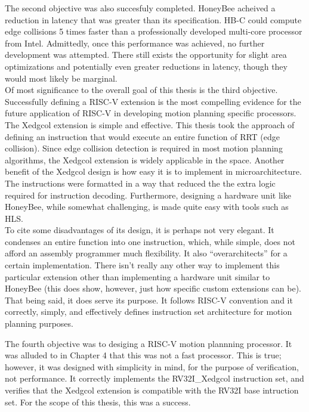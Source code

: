     The second objective was also succesfuly completed. HoneyBee acheived a reduction in latency that was greater than its specification. HB-C could compute edge collisions 5 times faster than a professionally developed multi-core processor from Intel. Admittedly, once this performance was achieved, no further development was attempted. There still exists the opportunity for slight area optimizations and potentially even greater reductions in latency, though they would most likely be marginal. \\

    Of most significance to the overall goal of this thesis is the third objective. Successfully defining a RISC-V extension is the most compelling evidence for the future application of RISC-V in developing motion planning specific processors. \\
    The Xedgcol extension is simple and effective. This thesis took the approach of defining an instruction that would execute an entire function of RRT (edge collision). Since edge collision detection is required in most motion planning algorithms, the Xedgcol extension is widely applicable in the space. Another benefit of the Xedgcol design is how easy it is to implement in microarchitecture. The instructions were formatted in a way that reduced the the extra logic required for instruction decoding. Furthermore, designing a hardware unit like HoneyBee, while somewhat challenging, is made quite easy with tools such as \gls{HLS}. \\
    To cite some disadvantages of its design, it is perhaps not very elegant. It condenses an entire function into one instruction, which, while simple, does not afford an assembly programmer much flexibility. It also ``overarchitects'' for a certain implementation. There isn't really any other way to implement this particular extension other than implementing a hardware unit similar to HoneyBee (this does show, however, just how specific custom extensions can be).\\
    That being said, it does serve its purpose. It follows RISC-V convention and it correctly, simply, and effectively defines instruction set architecture for motion planning purposes.

    The fourth objective was to  desiging a RISC-V motion plannning processor. It was alluded to in Chapter 4 that this was not a fast processor. This is true; however, it was designed with simplicity in mind, for the purpose of verification, not performance. It correctly implements the RV32I\_Xedgcol instruction set, and verifies that the Xedgcol extension is compatible with the RV32I base intruction set. For the scope of this thesis, this was a success.

